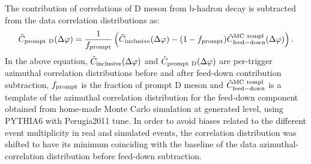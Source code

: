 \label{BeautyFeedDownSection}
The contribution of correlations of D meson from b-hadron decay is subtracted from the data correlation distributions as:
\begin{equation}
\tilde{C}_{\rm prompt~D}(\Delta\varphi)=\frac{1}{f_{\rm prompt}}\left(\tilde{C}_{\rm inclusive}(\Delta\varphi)-(1-f_{\rm prompt})\tilde{C}_{\rm feed-down}^{\rm MC~templ}(\Delta\varphi) \right).
\label{eqFeedDown}
\end{equation}
In the above equation, $\tilde{C}_{\rm inclusive}(\Delta\varphi)$ and $\tilde{C}_{\rm prompt~D}(\Delta\varphi)$ are per-trigger azimuthal correlation distributions before and after
feed-down contribution subtraction, $f_{\rm prompt}$ is the fraction of prompt D meson and $\tilde{C}_{\rm feed-down}^{\rm MC~templ}$ is a template
of the azimuthal correlation distribution for the feed-down component obtained from home-made Monte Carlo simulation at generated level, using PYTHIA6 with Perugia2011 tune.
In order to avoid biases related to the different event multiplicity in real and simulated events, the correlation distribution was shifted to have its minimum coinciding with the baseline of the data azimuthal-correlation distribution before feed-down subtraction. %

